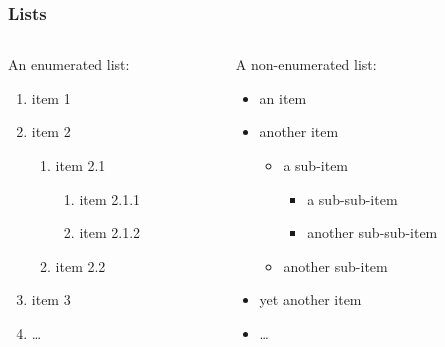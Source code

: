 \documentclass{beamer}
\begin{document}
\begin{frame}
\frametitle{\textbf{Lists}}
\begin{columns}
\begin{column}{0.5\textwidth}
An enumerated list:
\begin{enumerate}
\item item 1
\item item 2
\begin{enumerate}
\item item 2.1
\begin{enumerate}
\item item 2.1.1
\item item 2.1.2
\end{enumerate}
\item item 2.2
\end{enumerate}
\item item 3
\item \dots
\end{enumerate}
\end{column}
\begin{column}{0.5\textwidth}
A non-enumerated list:
\begin{itemize}
\item an item
\item another item
\begin{itemize}
\item a sub-item
\begin{itemize}
\item a sub-sub-item
\item another sub-sub-item
\end{itemize}
\item another sub-item
\end{itemize}
\item yet another item
\item \dots
\end{itemize}
\end{column}
\end{columns}
\end{frame}
\end{document}
